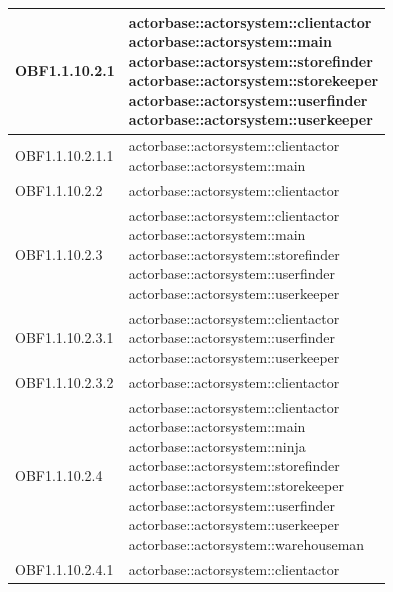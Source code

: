 \documentclass{scalatekids-article}
\begin{document}
\begin{longtable}[H]{|p{6cm}|p{11cm}|}
\hline
OBF1.1.10.2.1 & \multiLineCell[t]{actorbase::actorsystem::clientactor\\actorbase::actorsystem::main\\actorbase::actorsystem::storefinder\\actorbase::actorsystem::storekeeper\\actorbase::actorsystem::userfinder\\actorbase::actorsystem::userkeeper\\}\\
\hline
OBF1.1.10.2.1.1 & \multiLineCell[t]{actorbase::actorsystem::clientactor\\actorbase::actorsystem::main\\}\\
\hline
OBF1.1.10.2.2 & \multiLineCell[t]{actorbase::actorsystem::clientactor\\}\\
\hline
OBF1.1.10.2.3 & \multiLineCell[t]{actorbase::actorsystem::clientactor\\actorbase::actorsystem::main\\actorbase::actorsystem::storefinder\\actorbase::actorsystem::userfinder\\actorbase::actorsystem::userkeeper\\}\\
\hline
OBF1.1.10.2.3.1 & \multiLineCell[t]{actorbase::actorsystem::clientactor\\actorbase::actorsystem::userfinder\\actorbase::actorsystem::userkeeper\\}\\
\hline
OBF1.1.10.2.3.2 & \multiLineCell[t]{actorbase::actorsystem::clientactor\\}\\
\hline
OBF1.1.10.2.4 & \multiLineCell[t]{actorbase::actorsystem::clientactor\\actorbase::actorsystem::main\\actorbase::actorsystem::ninja\\actorbase::actorsystem::storefinder\\actorbase::actorsystem::storekeeper\\actorbase::actorsystem::userfinder\\actorbase::actorsystem::userkeeper\\actorbase::actorsystem::warehouseman\\}\\
\hline
OBF1.1.10.2.4.1 & \multiLineCell[t]{actorbase::actorsystem::clientactor\\}\\

\end{longtable}
\end{document}
